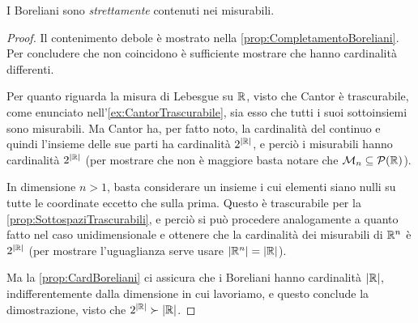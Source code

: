 \begin{corollary}\label{cor:BorelianiNonMisurabili}
	I Boreliani sono \emph{strettamente} contenuti nei misurabili.
\end{corollary}
\begin{proof}
	Il contenimento debole è mostrato nella \cref{prop:CompletamentoBoreliani}.
	Per concludere che non coincidono è sufficiente mostrare che hanno cardinalità differenti.
	
	Per quanto riguarda la misura di Lebesgue su $\mathbb R$, visto che Cantor è trascurabile, come enunciato nell'\cref{ex:CantorTrascurabile}, sia esso che tutti i suoi sottoinsiemi sono misurabili. 
	Ma Cantor ha, per fatto noto, la cardinalità del continuo e quindi l'insieme delle sue parti ha cardinalità $2^{|\mathbb R|}$, e perciò i misurabili hanno cardinalità $2^{|\mathbb R|}$ (per mostrare che non è maggiore basta notare che $\mathcal M_n\subseteq\mathcal P(\mathbb R)$).
	
	In dimensione $n>1$, basta considerare un insieme i cui elementi siano nulli su tutte le coordinate eccetto che sulla prima. Questo è trascurabile per la \cref{prop:SottospaziTrascurabili}, e perciò si può procedere analogamente a quanto fatto nel caso unidimensionale e ottenere che la cardinalità dei misurabili di $\mathbb R^n$ è $2^{|\mathbb R|}$ (per mostrare l'uguaglianza serve usare $|\mathbb R^n|=|\mathbb R|$).
	
	Ma la \cref{prop:CardBoreliani} ci assicura che i Boreliani hanno cardinalità $|\mathbb R|$, indifferentemente dalla dimensione in cui lavoriamo, e questo conclude la dimostrazione, visto che $2^{|\mathbb R|}\succ |\mathbb R|$.
\end{proof}

